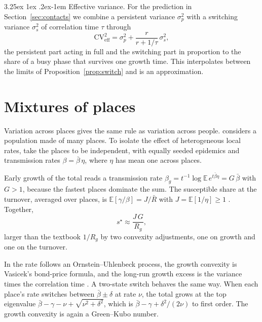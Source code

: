 \documentclass[11pt]{article}
\makeatletter
\renewcommand\paragraph{\@startsection{paragraph}{4}{\z@}%
  {3.25ex \@plus1ex \@minus.2ex}{-1em}%
  {\normalfont\normalsize\itshape}}
\theoremstyle{remark}
\newcommand{\CV}{\mathrm{CV}}
\makeatother
\begin{document}
\paragraph{Effective variance.} For the prediction in Section~\ref{sec:contacts} we combine a persistent variance
$\sigma_p^2$ with a switching variance $\sigma_s^2$ of correlation time $\tau$ through
\begin{equation}\label{eq:cveff}
  \CV^2_{\text{eff}} = \sigma_p^2 + \frac{r}{r + 1/\tau}\,\sigma_s^2 ,
\end{equation}
the persistent part acting in full and the switching part in proportion to the share of a busy phase that survives
one growth time. This interpolates between the limits of Proposition~\ref{prop:switch} and is an approximation.

\section{Mixtures of places}

Variation across places gives the same rule as variation across people. \citet{cotton2020herd} considers a
population made of many places. To isolate the effect of heterogeneous local rates, take the places to be independent,
with equally seeded epidemics and transmission rates $\beta = \bar\beta\,\eta$, where $\eta$ has mean one across
places.

Early growth of the total reads a transmission rate $\beta_g = t^{-1}\log\mathbb{E}\,e^{t\bar\beta\eta} = G\,\bar\beta$
with $G > 1$, because the fastest places dominate the sum. The susceptible share at the turnover, averaged over
places, is $\mathbb{E}[\gamma/\beta] = J/\bar R$ with $J = \mathbb{E}[1/\eta] \ge 1$ \citep[\S\S3.1--3.2]{cotton2020herd}.
Together,
\begin{equation}
  s^\star \approx \frac{J\,G}{R_g},
\end{equation}
larger than the textbook $1/R_g$ by two convexity adjustments, one on growth and one on the turnover.

In \citet{cotton2020herd} the rate follows an Ornstein--Uhlenbeck process, the growth convexity is Vasicek's
bond-price formula, and the long-run growth excess is the variance times the correlation time
\citep[eq.~16]{cotton2020herd}. A two-state switch behaves the same way. When each place's rate switches between
$\bar\beta \pm \delta$ at rate $\nu$, the total grows at the top eigenvalue $\bar\beta - \gamma - \nu + \sqrt{\nu^2 +
\delta^2}$, which is $\bar\beta - \gamma + \delta^2/(2\nu)$ to first order. The growth convexity is again a
Green--Kubo number.
\end{document}
